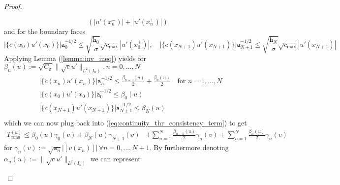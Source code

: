\begin{proof}
\begin{proofstep}[Continuity]
\begin{equation}
            \left( |u'(x_n^-)| + |u'(x_n^+)| \right) \nonumber
        \end{equation}
        and for the boundary faces
        \begin{equation}
            \big|\{c(x_0)u'(x_0)\}\big|\texttt{a}_0^{-1/2} 
            \leq \sqrt{\frac{\texttt{h}_0}{\sigma}} \sqrt{c_{\max}}
            |u'(x_0^+)|, 
            \quad \big|\{c(x_{N+1})u'(x_{N+1})\}\big|\texttt{a}_{N+1}^{-1/2} 
            \leq \sqrt{\frac{\texttt{h}_{N}}{\sigma}} \sqrt{c_{\max}}
            |u'(x_{N+1}^-)| \nonumber
        \end{equation}
        Applying Lemma (\ref{lemma:inv_ineq}) yields for 
        $\displaystyle \beta_n(u) := \sqrt{C_{\sigma}} \|\sqrt{c}u'\|_{L^2(I_{n})}, n=0,\ldots,N$
        \begin{align*}
            &\big|\{c(x_n)u'(x_n)\}\big|\texttt{a}_n^{-1/2} \leq \frac{\beta_{n-1}(u)}{2}
             + \frac{\beta_n(u)}{2}  \quad \text{for } n=1,\ldots,N\\
            &\big|\{c(x_0)u'(x_0)\}\big|\texttt{a}_0^{-1/2} \leq \beta_0(u)  \\
            &\big|\{c(x_{N+1})u'(x_{N+1})\}\big|\texttt{a}_{N+1}^{-1/2} \leq \beta_{N}(u)  \\
        \end{align*}
        which we can now plug back into (\ref{eq:continuity_thr_consistency_term}) to get
        \begin{align}
            T_{\text{cons}}^{(u)} 
            \leq \beta_0(u)\gamma_0(v) + \beta_{N}(u)\gamma_{N+1}(v)
            &+ \sum_{n=1}^{N} \frac{\beta_{n-1}(u)}{2} \gamma_{n} (v)+ \sum_{n=1}^{N} \frac{\beta_{n}(u)}{2} \gamma_n(v)
        \end{align}
        for $\displaystyle \gamma_n(v) := \sqrt{\texttt{a}_n}\big|[v(x_n)]\big| \, \forall n=0,\ldots,N+1$.
        By furthermore denoting $ \alpha_n(u):= \|\sqrt{c}u'\|_{L^2(I_n)}$
        we can represent


\end{proofstep}
\end{proof}
